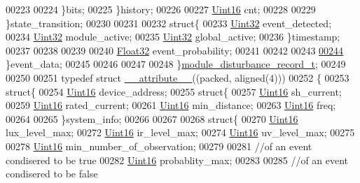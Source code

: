 \begin{DoxyCode}
00223 
00224         \}bits;
00225     \}history;
00226 
00227     \hyperlink{a00004_aae7407b021d43f7193a81a58cfb3e297}{Uint16} cnt;
00228 
00229     \}state\_transition;
00230 
00231 
00232     \textcolor{keyword}{struct}\{
00233      \hyperlink{a00004_ab56a7153a5b218eac7698ff141009735}{Uint32}                    event\_detected;
00234      \hyperlink{a00004_ab56a7153a5b218eac7698ff141009735}{Uint32}                    module\_active;
00235      \hyperlink{a00004_ab56a7153a5b218eac7698ff141009735}{Uint32}                    global\_active;
00236     \}timestamp;
00237 
00238 
00239 
00240     \hyperlink{a00004_a87d38f886e617ced2698fc55afa07637}{Float32}                    event\_probability;
00241 
00242 
00243 
\hypertarget{a00006_source_l00244}{}\hyperlink{a00019_a5a700ec4c240f4e86c5fb61aef8d983e}{00244}     \}event\_data;
00245 
00246 
00247 
00248 \}\hyperlink{a00019}{module\_disturbance\_record\_t};
00249 
00250 
00251 \textcolor{keyword}{typedef} \textcolor{keyword}{struct }\hyperlink{a00006_ad8187eb7fe09751a387e3dcb11c51565}{\_\_attribute\_\_}((packed, aligned(4)))
00252 \{
00253     \textcolor{keyword}{struct}\{
00254         \hyperlink{a00004_aae7407b021d43f7193a81a58cfb3e297}{Uint16}                              device\_address;
00255         \textcolor{keyword}{struct}\{
00257         \hyperlink{a00004_aae7407b021d43f7193a81a58cfb3e297}{Uint16}                              sh\_current;
00259         \hyperlink{a00004_aae7407b021d43f7193a81a58cfb3e297}{Uint16}                              rated\_current;
00261         \hyperlink{a00004_aae7407b021d43f7193a81a58cfb3e297}{Uint16}                              min\_distance;
00263         \hyperlink{a00004_aae7407b021d43f7193a81a58cfb3e297}{Uint16}                              freq;
00264 
00265         \}system\_info;
00266 
00267 
00268         \textcolor{keyword}{struct}\{
00270         \hyperlink{a00004_aae7407b021d43f7193a81a58cfb3e297}{Uint16}                              lux\_level\_max;
00272         \hyperlink{a00004_aae7407b021d43f7193a81a58cfb3e297}{Uint16}                              ir\_level\_max;
00274         \hyperlink{a00004_aae7407b021d43f7193a81a58cfb3e297}{Uint16}                              uv\_level\_max;
00275 
00278         \hyperlink{a00004_aae7407b021d43f7193a81a58cfb3e297}{Uint16}                              min\_number\_of\_observation;
00279 
00281         \textcolor{comment}{//of an event condisered to be true}
00282         \hyperlink{a00004_aae7407b021d43f7193a81a58cfb3e297}{Uint16}                              probablity\_max;
00283 
00285         \textcolor{comment}{//of an event condisered to be false}

\end{DoxyCode}
